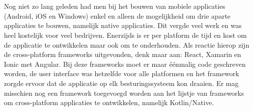 %
%

%



\chapter*{}

Nog niet zo lang geleden had men bij het bouwen van mobiele applicaties (Android, iOS en Windows) enkel en alleen de mogelijkheid om drie aparte applicaties te bouwen, namelijk native applicaties. Dit vergde veel werk en was heel kostelijk voor veel bedrijven. Enerzijds is er per platform de tijd en kost om de applicatie te ontwikkelen maar ook om te onderhouden. Als reactie hierop zijn de cross-platform frameworks uitgevonden, denk maar aan: React, Xamarin en Ionic met Angular. Bij deze frameworks moet er maar éénmalig code geschreven worden, de user interface was hetzelfde voor alle platformen en het framework zorgde ervoor dat de applicatie op elk besturingssysteem kon draaien. Er mag misschien nog een framework toegevoegd worden aan het lijstje van frameworks om cross-platform applicaties te ontwikkelen, namelijk Kotlin/Native.

